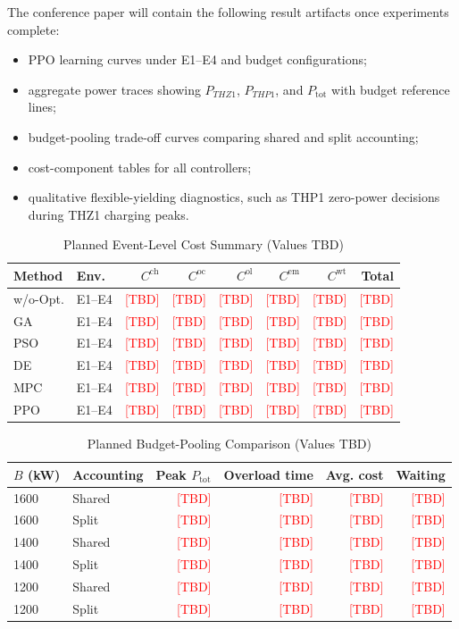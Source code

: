 \documentclass[conference]{IEEEtran}
\newcommand{\todo}[1]{\textcolor{red}{[TBD]}}
\newcommand{\thz}{THZ1}
\newcommand{\thp}{THP1}
\begin{document}
The conference paper will contain the following result artifacts once experiments complete:
\begin{itemize}
    \item PPO learning curves under E1--E4 and budget configurations;
    \item aggregate power traces showing $P_{\thz}$, $P_{\thp}$, and $P_{\mathrm{tot}}$ with budget reference lines;
    \item budget-pooling trade-off curves comparing shared and split accounting;
    \item cost-component tables for all controllers;
    \item qualitative flexible-yielding diagnostics, such as \thp{} zero-power decisions during \thz{} charging peaks.
\end{itemize}

\begin{table}[t]
\centering
\caption{Planned Event-Level Cost Summary (Values TBD)}
\label{tab:cost-summary}
\begin{tabular}{llrrrrrr}
\toprule
Method & Env. & $C^{\mathrm{ch}}$ & $C^{\mathrm{oc}}$ & $C^{\mathrm{ol}}$ & $C^{\mathrm{em}}$ & $C^{\mathrm{wt}}$ & Total \\
\midrule
w/o-Opt. & E1--E4 & \todo{} & \todo{} & \todo{} & \todo{} & \todo{} & \todo{} \\
GA & E1--E4 & \todo{} & \todo{} & \todo{} & \todo{} & \todo{} & \todo{} \\
PSO & E1--E4 & \todo{} & \todo{} & \todo{} & \todo{} & \todo{} & \todo{} \\
DE & E1--E4 & \todo{} & \todo{} & \todo{} & \todo{} & \todo{} & \todo{} \\
MPC & E1--E4 & \todo{} & \todo{} & \todo{} & \todo{} & \todo{} & \todo{} \\
PPO & E1--E4 & \todo{} & \todo{} & \todo{} & \todo{} & \todo{} & \todo{} \\
\bottomrule
\end{tabular}
\end{table}

\begin{table}[t]
\centering
\caption{Planned Budget-Pooling Comparison (Values TBD)}
\label{tab:budget-pooling}
\begin{tabular}{llrrrr}
\toprule
$B$ (kW) & Accounting & Peak $P_{\mathrm{tot}}$ & Overload time & Avg. cost & Waiting \\
\midrule
1600 & Shared & \todo{} & \todo{} & \todo{} & \todo{} \\
1600 & Split & \todo{} & \todo{} & \todo{} & \todo{} \\
1400 & Shared & \todo{} & \todo{} & \todo{} & \todo{} \\
1400 & Split & \todo{} & \todo{} & \todo{} & \todo{} \\
1200 & Shared & \todo{} & \todo{} & \todo{} & \todo{} \\
1200 & Split & \todo{} & \todo{} & \todo{} & \todo{} \\
\bottomrule
\end{tabular}
\end{table}
\end{document}
